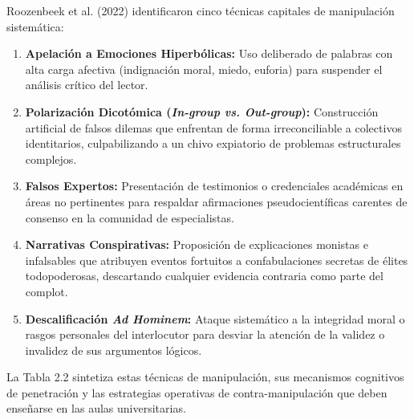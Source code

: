 Roozenbeek et al. (2022) identificaron cinco técnicas capitales de manipulación sistemática:
\begin{enumerate}
    \item \textbf{Apelación a Emociones Hiperbólicas:} Uso deliberado de palabras con alta carga afectiva (indignación moral, miedo, euforia) para suspender el análisis crítico del lector.
    \item \textbf{Polarización Dicotómica (\textit{In-group vs. Out-group}):} Construcción artificial de falsos dilemas que enfrentan de forma irreconciliable a colectivos identitarios, culpabilizando a un chivo expiatorio de problemas estructurales complejos.
    \item \textbf{Falsos Expertos:} Presentación de testimonios o credenciales académicas en áreas no pertinentes para respaldar afirmaciones pseudocientíficas carentes de consenso en la comunidad de especialistas.
    \item \textbf{Narrativas Conspirativas:} Proposición de explicaciones monistas e infalsables que atribuyen eventos fortuitos a confabulaciones secretas de élites todopoderosas, descartando cualquier evidencia contraria como parte del complot.
    \item \textbf{Descalificación \textit{Ad Hominem}:} Ataque sistemático a la integridad moral o rasgos personales del interlocutor para desviar la atención de la validez o invalidez de sus argumentos lógicos.
\end{enumerate}

La Tabla 2.2 sintetiza estas técnicas de manipulación, sus mecanismos cognitivos de penetración y las estrategias operativas de contra-manipulación que deben enseñarse en las aulas universitarias.

